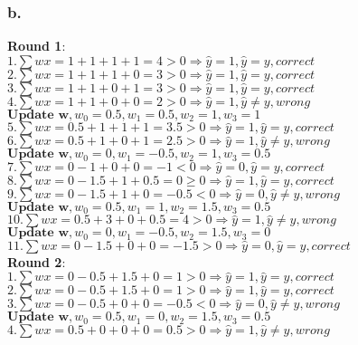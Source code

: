\documentclass{article}
\begin{document}
            \subsubsection{b.}
		\textbf{Round 1}:\\
                $1.\sum wx=1+1+1+1=4>0\Rightarrow\hat{y}=1,\hat{y}=y,correct$\\
		$2.\sum wx=1+1+1+0=3>0\Rightarrow\hat{y}=1,\hat{y}=y,correct$\\
                $3.\sum wx=1+1+0+1=3>0\Rightarrow\hat{y}=1,\hat{y}=y,correct$\\
                $4.\sum wx=1+1+0+0=2>0\Rightarrow\hat{y}=1,\hat{y}\neq y,wrong$\\
		$\textbf{Update\ w},w_0=0.5,w_1=0.5,w_2=1,w_3=1$\\
                $5.\sum wx=0.5+1+1+1=3.5>0\Rightarrow\hat{y}=1,\hat{y}=y,correct$\\
                $6.\sum wx=0.5+1+0+1=2.5>0\Rightarrow\hat{y}=1,\hat{y}\neq y,wrong$\\
		$\textbf{Update\ w},w_0=0,w_1=-0.5,w_2=1,w_3=0.5$\\
                $7.\sum wx=0-1+0+0=-1<0\Rightarrow\hat{y}=0,\hat{y}=y,correct$\\
                $8.\sum wx=0-1.5+1+0.5=0\geq 0\Rightarrow\hat{y}=1,\hat{y}=y,correct$\\
                $9.\sum wx=0-1.5+1+0=-0.5<0\Rightarrow\hat{y}=0,\hat{y}\neq y,wrong$\\
		$\textbf{Update\ w},w_0=0.5,w_1=1,w_2=1.5,w_3=0.5$\\
                $10.\sum wx=0.5+3+0+0.5=4>0\Rightarrow\hat{y}=1,\hat{y}\neq y,wrong$\\
		$\textbf{Update\ w},w_0=0,w_1=-0.5,w_2=1.5,w_3=0$\\
                $11.\sum wx=0-1.5+0+0=-1.5>0\Rightarrow\hat{y}=0,\hat{y}=y,correct$\\
		\textbf{Round 2}:\\
                $1.\sum wx=0-0.5+1.5+0=1>0\Rightarrow\hat{y}=1,\hat{y}=y,correct$\\
                $2.\sum wx=0-0.5+1.5+0=1>0\Rightarrow\hat{y}=1,\hat{y}=y,correct$\\	
                $3.\sum wx=0-0.5+0+0=-0.5<0\Rightarrow\hat{y}=0,\hat{y}\neq y,wrong$\\
		$\textbf{Update\ w},w_0=0.5,w_1=0,w_2=1.5,w_3=0.5$\\
		$4.\sum wx=0.5+0+0+0=0.5>0\Rightarrow\hat{y}=1,\hat{y}\neq y,wrong$\\
\end{document}
